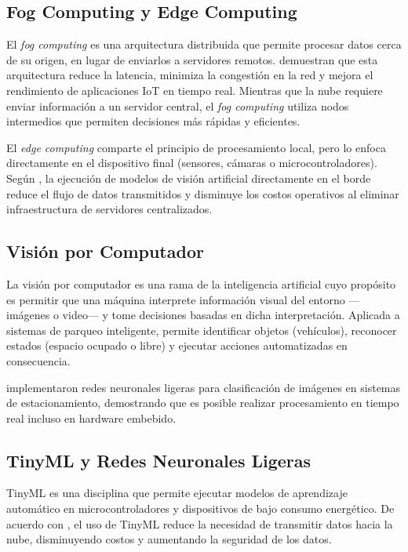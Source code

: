 \documentclass[12pt, letterpaper]{article}
\begin{document}
\subsection{Fog Computing y Edge Computing}
El \textit{fog computing} es una arquitectura distribuida que permite procesar datos cerca de su origen, en lugar de enviarlos a servidores remotos. \textcite{celaya2020fog} demuestran que esta arquitectura reduce la latencia, minimiza la congestión en la red y mejora el rendimiento de aplicaciones IoT en tiempo real. Mientras que la nube requiere enviar información a un servidor central, el \textit{fog computing} utiliza nodos intermedios que permiten decisiones más rápidas y eficientes.

El \textit{edge computing} comparte el principio de procesamiento local, pero lo enfoca directamente en el dispositivo final (sensores, cámaras o microcontroladores). Según \textcite{zheng2025iot}, la ejecución de modelos de visión artificial directamente en el borde reduce el flujo de datos transmitidos y disminuye los costos operativos al eliminar infraestructura de servidores centralizados.

\subsection{Visión por Computador}
La visión por computador es una rama de la inteligencia artificial cuyo propósito es permitir que una máquina interprete información visual del entorno —imágenes o video— y tome decisiones basadas en dicha interpretación. Aplicada a sistemas de parqueo inteligente, permite identificar objetos (vehículos), reconocer estados (espacio ocupado o libre) y ejecutar acciones automatizadas en consecuencia.

\textcite{zheng2025iot} implementaron redes neuronales ligeras para clasificación de imágenes en sistemas de estacionamiento, demostrando que es posible realizar procesamiento en tiempo real incluso en hardware embebido.

\subsection{TinyML y Redes Neuronales Ligeras}
TinyML es una disciplina que permite ejecutar modelos de aprendizaje automático en microcontroladores y dispositivos de bajo consumo energético. De acuerdo con \textcite{tinyml2022EdgeImpulse}, el uso de TinyML reduce la necesidad de transmitir datos hacia la nube, disminuyendo costos y aumentando la seguridad de los datos.
\end{document}
